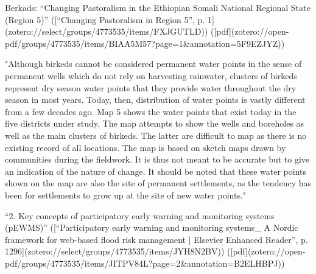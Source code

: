 Berkads:
“Changing Pastoralism in the Ethiopian Somali National Regional State (Region 5)” ([“Changing Pastoralism in Region 5”, p. 1](zotero://select/groups/4773535/items/FXJGUTLD)) ([pdf](zotero://open-pdf/groups/4773535/items/BIAA5M57?page=1&annotation=5F9EZJYZ))

"Although birkeds cannot be considered permanent water points in the sense of permanent wells which do not rely on harvesting rainwater, clusters of birkeds represent dry season water points that they provide water throughout the dry season in most years. Today, then, distribution of water points is vastly different from a few decades ago. Map 5 shows the water points that exist today in the five districts under study. The map attempts to show the wells and boreholes as well as the main clusters of birkeds. The latter are difficult to map as there is no existing record of all locations. The map is based on sketch maps drawn by communities during the fieldwork. It is thus not meant to be accurate but to give an indication of the nature of change. It should be noted that these water points shown on the map are also the site of permanent settlements, as the tendency has been for settlements to grow up at the site of new water points."


“2. Key concepts of participatory early warning and monitoring systems (pEWMS)” ([“Participatory early warning and monitoring systems_ A Nordic framework for web-based flood risk management | Elsevier Enhanced Reader”, p. 1296](zotero://select/groups/4773535/items/JYH8N2BV)) ([pdf](zotero://open-pdf/groups/4773535/items/JITPV84L?page=2&annotation=B2ELHBPJ))

